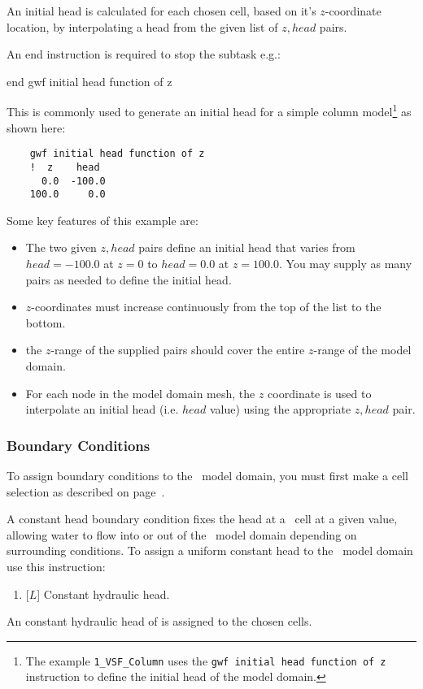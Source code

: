 {{     An initial head is calculated for each chosen cell, based on it's $z$-coordinate location, by interpolating a head from the given list of  $z, head$ pairs.

    An end instruction is required to stop the subtask e.g.:

    {\Large \sf end gwf initial head function of z}
    }

This is commonly used to generate an initial head for a simple column model\footnote{The example \texttt{1\_VSF\_Column} uses the \texttt{gwf initial head function of z} instruction to define the initial head of the model domain.} as shown here: 
\begin{verbatim}
    gwf initial head function of z
    !  z    head
      0.0  -100.0
    100.0     0.0
\end{verbatim}
\pagebreak
Some key features of this example are:
\begin{itemize}
  \item The two given $z,head$ pairs define an initial head  that varies from $head=-100.0$ at $z=0$ to $head=0.0$ at $z=100.0$.  You may supply as many pairs as needed to define the initial head.
  \item $z$-coordinates must increase continuously from the top of the list to the bottom.
  \item the $z$-range of the supplied pairs should cover the entire $z$-range of the model domain.
  \item For each node in the model domain  mesh, the $z$ coordinate is used to interpolate an initial head (i.e. $head$ value) using the appropriate $z, head$ pair.
\end{itemize}

\subsubsection{Boundary Conditions}  
To assign boundary conditions  to the \gwf\ model domain, you must first make a cell selection as described on page~\pageref{page:cellSelect}.

A constant head boundary condition fixes the head at a \gwf\ cell at a given value, allowing water to flow into or out of the \gwf\ model domain depending on surrounding conditions.    To assign a uniform constant head to the \gwf\ model domain use this instruction:

    {
        \squish
        \begin{enumerate}
        \item {} [$L$]   Constant hydraulic head.
        \end{enumerate}
          An constant hydraulic head  of  is assigned to the chosen cells.
    }

}
